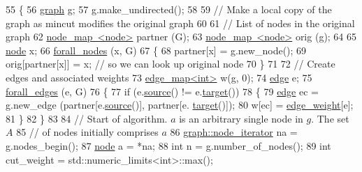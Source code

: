 \begin{DoxyCode}
55 \{
56     \mbox{\hyperlink{classgraph}{graph}} \mbox{\hyperlink{rings_8cpp_aa9df5aa3976a89a96a5f1c7611d42938}{g}};
57     \mbox{\hyperlink{rings_8cpp_aa9df5aa3976a89a96a5f1c7611d42938}{g}}.make\_undirected();
58 
59     \textcolor{comment}{// Make a local copy of the graph as mincut modifies the original graph}
60 
61     \textcolor{comment}{// List of nodes in the original graph}
62     \mbox{\hyperlink{classnode__map}{node\_map <node>}} partner (G);
63     \mbox{\hyperlink{classnode__map}{node\_map <node>}} orig (\mbox{\hyperlink{rings_8cpp_aa9df5aa3976a89a96a5f1c7611d42938}{g}});
64 
65     \mbox{\hyperlink{classnode}{node}} x;
66     \mbox{\hyperlink{graph_8h_a1905bf4c6aa7167b9ee5a2e72f12ad2d}{forall\_nodes}} (x, G)
67     \{
68         partner[x] = \mbox{\hyperlink{rings_8cpp_aa9df5aa3976a89a96a5f1c7611d42938}{g}}.new\_node(); 
69         orig[partner[x]] = x; \textcolor{comment}{// so we can look up original node}
70     \}
71 
72     \textcolor{comment}{// Create edges and associated weights}
73     \mbox{\hyperlink{classedge__map}{edge\_map<int>}} w(\mbox{\hyperlink{rings_8cpp_aa9df5aa3976a89a96a5f1c7611d42938}{g}}, 0);
74     \mbox{\hyperlink{classedge}{edge}} e;
75     \mbox{\hyperlink{graph_8h_ac57b09543204dcb7a1e2c76c793cf038}{forall\_edges}} (e, G)
76     \{
77         \textcolor{keywordflow}{if} (e.\mbox{\hyperlink{classedge_ae82d5701f7e6f71edc3c8b0e34bcd2b7}{source}}() != e.\mbox{\hyperlink{classedge_a97563b611261478ee19c6ce055f1a3ee}{target}}())
78         \{
79             \mbox{\hyperlink{classedge}{edge}} ec = \mbox{\hyperlink{rings_8cpp_aa9df5aa3976a89a96a5f1c7611d42938}{g}}.new\_edge (partner[e.\mbox{\hyperlink{classedge_ae82d5701f7e6f71edc3c8b0e34bcd2b7}{source}}()], partner[e.
      \mbox{\hyperlink{classedge_a97563b611261478ee19c6ce055f1a3ee}{target}}()]);
80             w[ec] = \mbox{\hyperlink{classmincut_a080162552b5350b4e42228c9d536904e}{edge\_weight}}[e];
81         \}
82     \}
83 
84     \textcolor{comment}{// Start of algorithm. $a$ is an arbitrary single node in $g$. The set $A$}
85     \textcolor{comment}{// of nodes initially comprises $a$}
86     \mbox{\hyperlink{classgraph_a2cb374b84c133ce13f94e73c3e5da7fa}{graph::node\_iterator}} na = \mbox{\hyperlink{rings_8cpp_aa9df5aa3976a89a96a5f1c7611d42938}{g}}.nodes\_begin();
87     \mbox{\hyperlink{classnode}{node}} a = *na;
88     \textcolor{keywordtype}{int} n = \mbox{\hyperlink{rings_8cpp_aa9df5aa3976a89a96a5f1c7611d42938}{g}}.number\_of\_nodes();
89     \textcolor{keywordtype}{int} cut\_weight = std::numeric\_limits<int>::max();

\end{DoxyCode}
